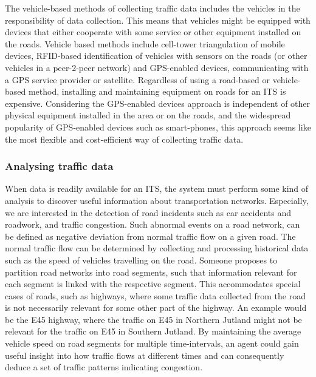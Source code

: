 The vehicle-based methods of collecting traffic data includes the vehicles in the responsibility of data collection. This means that vehicles might be equipped with devices that either cooperate with some service or other equipment installed on the roads. Vehicle based methods include cell-tower triangulation of mobile devices, RFID-based identification of vehicles with sensors on the roads (or other vehicles in a peer-2-peer network) and GPS-enabled devices, communicating with a GPS service provider or satellite. Regardless of using a road-based or vehicle-based method, installing and maintaining equipment on roads for an ITS is expensive. Considering the GPS-enabled devices approach is independent of other physical equipment installed in the area or on the roads, and the widespread popularity of GPS-enabled devices such as smart-phones, this approach seems like the most flexible and cost-efficient way of collecting traffic data.

\subsubsection*{Analysing traffic data}
When data is readily available for an ITS, the system must perform some kind of analysis to discover useful information about transportation networks. Especially, we are interested in the detection of road incidents such as car accidents and roadwork, and traffic congestion. Such abnormal events on a road network, can be defined as negative deviation from normal traffic flow on a given road. The normal traffic flow can be determined by collecting and processing historical data such as the speed of vehicles travelling on the road. Someone proposes to partition road networks into road segments, such that information relevant for each segment is linked with the respective segment. This accommodates special cases of roads, such as highways, where some traffic data collected from the road is not necessarily relevant for some other part of the highway. An example would be the E45 highway, where the traffic on E45 in Northern Jutland might not be relevant for the traffic on E45 in Southern Jutland. By maintaining the average vehicle speed on road segments for multiple time-intervals, an agent could gain useful insight into how traffic flows at different times and can consequently deduce a set of traffic patterns indicating congestion.
